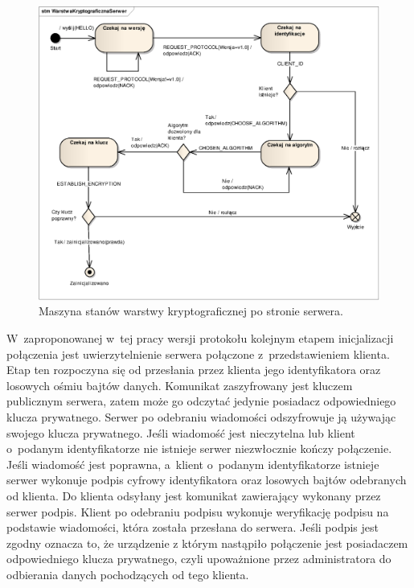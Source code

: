 \begin{figure}[h]
  \caption{Maszyna stanów warstwy kryptograficznej po stronie serwera.}
  \label{fig:kryptoSerwer}
  \centering
\includegraphics[width=1\textwidth]{img/kryptoSerwer}
\end{figure}

W~zaproponowanej w~tej pracy wersji protokołu kolejnym etapem
inicjalizacji połączenia jest uwierzytelnienie serwera połączone
z~przedstawieniem klienta. Etap ten rozpoczyna się od przesłania przez
klienta jego identyfikatora oraz losowych ośmiu bajtów
danych. Komunikat zaszyfrowany jest kluczem publicznym serwera, zatem
może go odczytać jedynie posiadacz odpowiedniego klucza
prywatnego. Serwer po odebraniu wiadomości odszyfrowuje ją używając
swojego klucza prywatnego. Jeśli wiadomość jest nieczytelna lub klient
o~podanym identyfikatorze nie istnieje serwer niezwłocznie kończy
połączenie. Jeśli wiadomość jest poprawna, a~klient o~podanym
identyfikatorze istnieje serwer wykonuje podpis cyfrowy identyfikatora
oraz losowych bajtów odebranych od klienta. Do klienta odsyłany jest
komunikat zawierający wykonany przez serwer podpis. Klient po
odebraniu podpisu wykonuje weryfikację podpisu na podstawie
wiadomości, która została przesłana do serwera. Jeśli podpis jest
zgodny oznacza to, że urządzenie z którym nastąpiło połączenie jest
posiadaczem odpowiedniego klucza prywatnego, czyli upoważnione przez
administratora do odbierania danych pochodzących od tego klienta.

